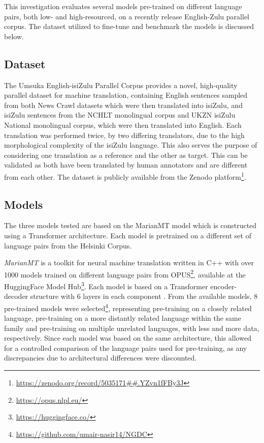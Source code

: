 \documentclass[11pt]{article}
\begin{document}
This investigation evaluates several models pre-trained on different language pairs, both low- and high-resourced, on a recently release English-Zulu parallel corpus. The dataset utilized to fine-tune and benchmark the models is discussed below. 

\subsection{Dataset}

The Umsuka English-isiZulu Parallel Corpus \citep{zulu_corpus} provides a novel, high-quality parallel dataset for machine translation, containing English sentences sampled from both News Crawl datasets which were then translated into isiZulu, and isiZulu sentences from the NCHLT monolingual corpus and UKZN isiZulu National monolingual corpus, which were then translated into English. Each translation was performed twice, by two differing translators, due to the high morphological complexity of the isiZulu language. This also serves the purpose of considering one translation as a reference and the other as target. This can be validated as both have been translated by human annotators and are different from each other. The dataset is publicly available from the Zenodo platform\footnote{\url{https://zenodo.org/record/5035171##.YZvn1fFBy3J}}. 



\subsection{Models}

The three models tested are based on the MarianMT model \citep{junczys2018marian} which is constructed using a Transformer architecture. Each model is pretrained on a different set of language pairs from the Helsinki Corpus. 


\emph{MarianMT} \citep{junczys2018marian} is a toolkit for neural machine translation written in C++ with over 1000 models trained on different language pairs from OPUS\footnote{\url{https://opus.nlpl.eu/}}, available at the HuggingFace Model Hub\footnote{\url{https://huggingface.co/}}. Each model is based on a Transformer encoder-decoder structure with 6 layers in each component \citep{junczys2018marian}. From the available models, $8$ pre-trained models were selected\footnote{\url{https://github.com/umair-nasir14/NGDC}}, representing pre-training on a closely related language, pre-training on a more distantly related language within the same family and pre-training on multiple unrelated languages, with less and more data, respectively. Since each model was based on the same architecture, this allowed for a controlled comparison of the language pairs used for pre-training,  as any discrepancies due to architectural differences were discounted.
\end{document}
